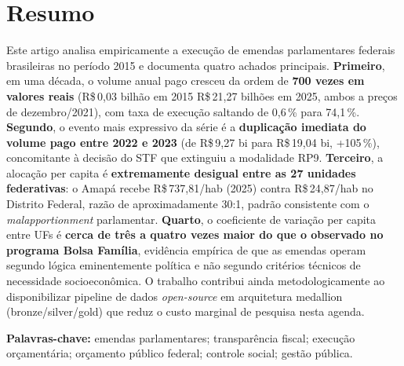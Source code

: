 \documentclass[12pt,a4paper,oneside]{article}
\newcommand{\rs}{R\$\,}
\begin{document}
\section*{Resumo}
\begin{singlespace}\small\noindent
Este artigo analisa empiricamente a execução de emendas parlamentares
federais brasileiras no período 2015 e documenta quatro
achados principais. \textbf{Primeiro}, em uma década, o volume anual
pago cresceu da ordem de \textbf{700 vezes em valores reais}
(\rs 0{,}03 bilhão em 2015 \textrightarrow{} \rs 21{,}27 bilhões em 2025,
ambos a preços de dezembro/2021), com taxa de execução saltando de
0{,}6\,\% para 74{,}1\,\%. \textbf{Segundo}, o evento mais expressivo
da série é a \textbf{duplicação imediata do volume pago entre 2022 e
2023} (de \rs 9{,}27 bi para \rs 19{,}04 bi, +105\,\%), concomitante
à decisão do STF que extinguiu a modalidade RP9. \textbf{Terceiro}, a
alocação per capita é \textbf{extremamente desigual entre as 27
unidades federativas}: o Amapá recebe \rs 737{,}81/hab (2025) contra
\rs 24{,}87/hab no Distrito Federal, razão de aproximadamente 30:1,
padrão consistente com o \textit{malapportionment} parlamentar.
\textbf{Quarto}, o coeficiente de variação per capita entre UFs é
\textbf{cerca de três a quatro vezes maior do que o observado no
programa Bolsa Família}, evidência empírica de que as emendas operam
segundo lógica eminentemente política e não segundo critérios técnicos
de necessidade socioeconômica. O trabalho contribui ainda
metodologicamente ao disponibilizar pipeline de dados \textit{open-source}
em arquitetura medallion (bronze/silver/gold) que reduz o custo
marginal de pesquisa nesta agenda.

\vspace{0.4cm}\noindent\textbf{Palavras-chave:}
emendas parlamentares; transparência fiscal; execução orçamentária;
orçamento público federal; controle social; gestão pública.
\end{singlespace}

\end{document}
